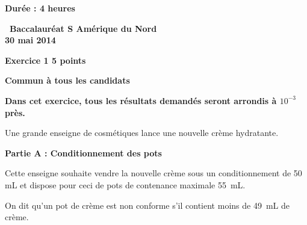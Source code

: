 \documentclass[10pt]{article}
\begin{document}
\pagestyle{fancy}
\thispagestyle{empty}
\begin{center}\textbf{Durée : 4 heures }

\vspace{0,5cm}

{\Large \textbf{\decofourleft~Baccalauréat S Amérique du Nord
~\decofourright\\30  mai 2014}}
\end{center}

\vspace{0,5cm}

\textbf{Exercice 1 \hfill  5 points}

\textbf{Commun à  tous les candidats}

\medskip

\textbf{Dans cet exercice, tous les résultats demandés seront arrondis à \boldmath $10^{-3}$ \unboldmath près.}

\medskip
 
Une grande enseigne de cosmétiques lance une nouvelle crème hydratante.

\medskip
 
\textbf{Partie A : Conditionnement des pots}

\medskip
 
Cette enseigne souhaite vendre la nouvelle crème sous un conditionnement de 50 mL et dispose pour ceci de pots de contenance maximale 55~mL.
 
On dit qu'un pot de crème est non conforme s'il contient moins de 49~mL de crème.

\medskip
 
\end{document}
